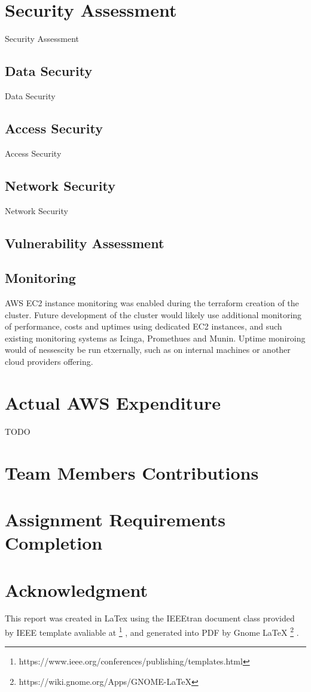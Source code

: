 \documentclass[conference]{IEEEtran}
\begin{document}
\section{Security Assessment}
Security Assessment
\subsection{Data Security}
Data Security
\subsection{Access Security}
Access Security
\subsection{Network Security}
Network Security
\subsection{Vulnerability Assessment}
\subsection{Monitoring}
AWS EC2 instance monitoring was enabled during the terraform creation of the cluster. Future development of the cluster would likely use additional monitoring of performance, costs and uptimes using dedicated EC2 instances, and such existing monitoring systems as Icinga, Promethues and Munin. Uptime moniroing would of nessescity be run etxernally, such as on internal machines or another cloud providers offering.
\section{Actual AWS Expenditure}
TODO
\section{Team Members Contributions}
\section{Assignment Requirements Completion}
\section{Acknowledgment}
This report was created in LaTex using the IEEEtran document class provided by IEEE template avaliable at
\footnote{https://www.ieee.org/conferences/publishing/templates.html}
, and generated into PDF by Gnome LaTeX
\footnote{https://wiki.gnome.org/Apps/GNOME-LaTeX}
.
\end{document}
